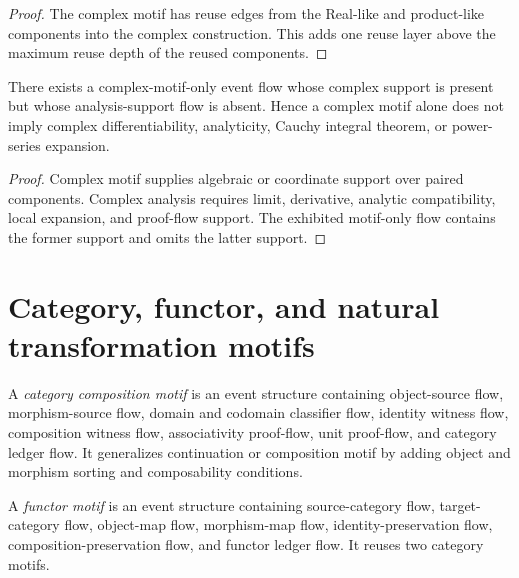 \begin{proof}
The complex motif has reuse edges from the Real-like and product-like components into the complex construction. This adds one reuse layer above the maximum reuse depth of the reused components.
\end{proof}

\begin{theorem}
\label{thm:higher-case-complex-not-analysis}
There exists a complex-motif-only event flow whose complex support is present but whose analysis-support flow is absent. Hence a complex motif alone does not imply complex differentiability, analyticity, Cauchy integral theorem, or power-series expansion.
\end{theorem}

\begin{proof}
Complex motif supplies algebraic or coordinate support over paired components. Complex analysis requires limit, derivative, analytic compatibility, local expansion, and proof-flow support. The exhibited motif-only flow contains the former support and omits the latter support.
\end{proof}

\section{Category, functor, and natural transformation motifs}
\label{sec:higher-case-category-functor}

\begin{definition}
\label{def:higher-case-category-composition-motif}
A \emph{category composition motif} is an event structure containing object-source flow, morphism-source flow, domain and codomain classifier flow, identity witness flow, composition witness flow, associativity proof-flow, unit proof-flow, and category ledger flow. It generalizes continuation or composition motif by adding object and morphism sorting and composability conditions.
\end{definition}

\begin{definition}
\label{def:higher-case-functor-motif}
A \emph{functor motif} is an event structure containing source-category flow, target-category flow, object-map flow, morphism-map flow, identity-preservation flow, composition-preservation flow, and functor ledger flow. It reuses two category motifs.
\end{definition}

